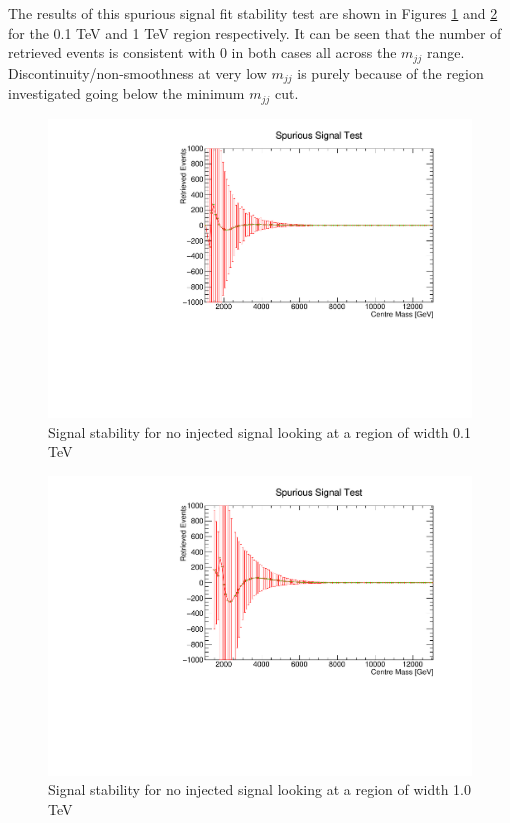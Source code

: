 The results of this spurious signal fit stability test are shown in Figures \ref{fig:SpuriousSignalInjectionFitStabilityStudy0.1TeVRegion} and \ref{fig:SpuriousSignalInjectionFitStabilityStudy1.0TeVRegion} for the 0.1 TeV and 1 TeV region respectively. It can be seen that the number of retrieved events is consistent with 0 in both cases all across the $m_{jj}$ range. Discontinuity/non-smoothness at very low $m_{jj}$ is purely because of the region investigated going below the minimum $m_{jj}$ cut.

\begin{figure}
    \centering
    \includegraphics[trim={0cm 0cm 2cm 1cm},clip,width=1.0\linewidth]{figures/app-GlobalFitStability/spuriousSignalFitStabilityWidth100.pdf}
    \caption{Signal stability for no injected signal looking at a region of width 0.1 TeV}
    \label{fig:SpuriousSignalInjectionFitStabilityStudy0.1TeVRegion}
\end{figure}
\begin{figure}
    \centering
    \includegraphics[trim={0cm 0cm 2cm 1cm},clip,width=1.0\linewidth]{figures/app-GlobalFitStability/spuriousSignalFitStabilityWidth1000.pdf}
    \caption{Signal stability for no injected signal looking at a region of width 1.0 TeV}
    \label{fig:SpuriousSignalInjectionFitStabilityStudy1.0TeVRegion}
\end{figure}
